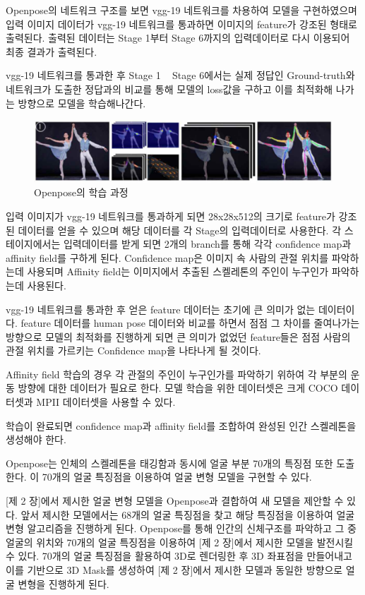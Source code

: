 \documentclass[chapter,oneside]{oblivoir}
\begin{document}
Openpose의 네트워크 구조를 보면 vgg-19 네트워크를 차용하여 모델을 구현하였으며 입력 이미지 데이터가 vgg-19 네트워크를 통과하면 이미지의 feature가 강조된 형태로 출력된다. 출력된 데이터는 Stage 1부터 Stage 6까지의 입력데이터로 다시 이용되어 최종 결과가 출력된다.

vgg-19 네트워크를 통과한 후 Stage 1 ~ Stage 6에서는 실제 정답인 Ground-truth와 네트워크가 도출한 정답과의 비교를 통해 모델의 loss값을 구하고 이를 최적화해 나가는 방향으로 모델을 학습해나간다.

\begin{figure}[h!]
  \centering
    \includegraphics[scale = 0.7]{pic/chp3/img765}
  \caption{Openpose의 학습 과정\cite{reference10}}
\end{figure}


입력 이미지가 vgg-19 네트워크를 통과하게 되면 28x28x512의 크기로 feature가 강조된 데이터를 얻을 수 있으며 해당 데이터를 각 Stage의 입력데이터로 사용한다. 각 스테이지에서는 입력데이터를 받게 되면 2개의 branch를 통해 각각 confidence map과 affinity field를 구하게 된다. Confidence map은 이미지 속 사람의 관절 위치를 파악하는데 사용되며 Affinity field는 이미지에서 추출된 스켈레톤의 주인이 누구인가 파악하는데 사용된다.

vgg-19 네트워크를 통과한 후 얻은 feature 데이터는 초기에 큰 의미가 없는 데이터이다. feature 데이터를 human pose 데이터와 비교를 하면서 점점 그 차이를 줄여나가는 방향으로 모델의 최적화를 진행하게 되면 큰 의미가 없었던 feature들은 점점 사람의 관절 위치를 가르키는 Confidence map을 나타나게 될 것이다.

Affinity field 학습의 경우 각 관절의 주인이 누구인가를 파악하기 위하여 각 부분의 운동 방향에 대한 데이터가 필요로 한다. 모델 학습을 위한 데이터셋은 크게 COCO 데이터셋과 MPII 데이터셋을 사용할 수 있다.

학습이 완료되면 confidence map과 affinity field를 조합하여 완성된 인간 스켈레톤을 생성해야 한다.

Openpose는 인체의 스켈레톤을 태깅함과 동시에 얼굴 부분 70개의 특징점 또한 도출 한다. 이 70개의 얼굴 특징점을 이용하여 얼굴 변형 모델을 구현할 수 있다.

[제 2 장]에서 제시한 얼굴 변형 모델을 Openpose과 결합하여 새 모델을 제안할 수 있다. 앞서 제시한 모델에서는 68개의 얼굴 특징점을 찾고 해당 특징점을 이용하여 얼굴 변형 알고리즘을 진행하게 된다. Openpose를 통해 인간의 신체구조를 파악하고 그 중 얼굴의 위치와 70개의 얼굴 특징점을 이용하여 [제 2 장]에서 제시한 모델을 발전시킬 수 있다. 70개의 얼굴 특징점을 활용하여 3D로 렌더링한 후 3D 좌표점을 만들어내고 이를 기반으로 3D Mask를 생성하여 [제 2 장]에서 제시한 모델과 동일한 방향으로 얼굴 변형을 진행하게 된다.
\end{document}
